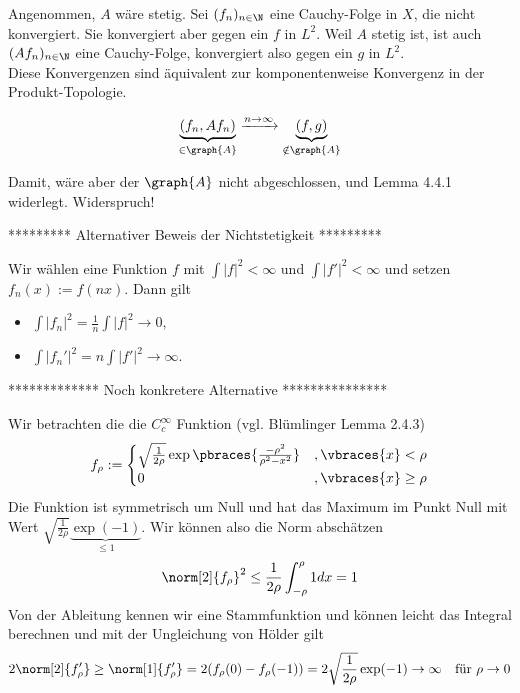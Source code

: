\begin{solution}
\begin{enumerate}
\begin{itemize}
    Angenommen, $A$ wäre stetig.
    Sei $(f_n)_{n \in \N}$ eine Cauchy-Folge in $X$, die nicht konvergiert.
    Sie konvergiert aber gegen ein $f$ in $L^2$.
    Weil $A$ stetig ist, ist auch $(A f_n)_{n \in \N}$ eine Cauchy-Folge, konvergiert also gegen ein $g$ in $L^2$. \\

    Diese Konvergenzen sind äquivalent zur komponentenweise Konvergenz in der Produkt-Topologie.

    \begin{align*}
      \underbrace{(f_n, A f_n)}_{\in \graph{A}}
      \xrightarrow{n \to \infty}
      \underbrace{(f, g)}_{\notin \graph{A}}
    \end{align*}

    Damit, wäre aber der $\graph{A}$ nicht abgeschlossen, und Lemma 4.4.1 widerlegt.
    Widerspruch!
    \FloatBarrier
  \end{itemize}

  ********* Alternativer Beweis der Nichtstetigkeit *********

Wir wählen eine Funktion $f$ mit $\int |f|^2 < \infty$ und $\int |f'|^2 < \infty$ und setzen $f_n(x) := f(nx).$ Dann gilt
\begin{itemize}
    \item $\int |f_n|^2 = \frac{1}{n} \int |f|^2 \longrightarrow 0,$
    \item $\int|f_n'|^2 = n \int |f'|^2 \longrightarrow \infty.$
\end{itemize}

  ************* Noch konkretere Alternative ***************

  Wir betrachten die die $C_c^\infty$ Funktion (vgl. Blümlinger Lemma 2.4.3)
  \begin{align*}
    f_\rho := 
    \begin{cases}
      \sqrt{\frac{1}{2\rho}}\exp\pbraces{\frac{- \rho^2}{\rho^2 - x^2}} &, \vbraces{x} < \rho \\
      0 &, \vbraces{x} \geq \rho
    \end{cases}
  \end{align*}
  Die Funktion ist symmetrisch um Null und hat das Maximum im Punkt Null mit Wert $\sqrt{\frac{1}{2\rho}} \underbrace{\exp(-1)}_{\leq 1}$. Wir können also die Norm abschätzen
  \begin{align*}
    \norm[2]{f_\rho}^2 \leq \frac{1}{2\rho} \int_{-\rho}^\rho 1 dx = 1
  \end{align*}
  Von der Ableitung kennen wir eine Stammfunktion und können leicht das Integral berechnen und mit der Ungleichung von Hölder gilt
  \begin{align*}
    2\norm[2]{f_\rho^\prime} \geq \norm[1]{f_\rho^\prime} = 2(f_\rho(0) - f_\rho(-1)) = 2 \sqrt\frac{1}{2\rho} \exp(-1) \to \infty \quad \textrm{für $\rho \to 0$}
  \end{align*}

\end{enumerate}

\end{solution}
